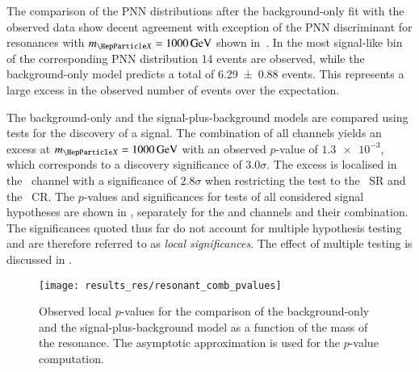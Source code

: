 The comparison of the PNN distributions after the background-only fit with the
observed data show decent agreement with exception of the PNN discriminant for
resonances with $\mX = \SI{1000}{\GeV}$ shown in~. In
the most signal-like bin of the corresponding PNN distribution 14 events are
observed, while the background-only model predicts a total of \num{6.29 +- 0.88}
events. This represents a large excess in the observed number of events over the
expectation.

%
The background-only and the signal-plus-background models are compared using
tests for the discovery of a signal. The combination of all channels yields an
excess at $\mX = \SI{1000}{\GeV}$ with an observed $p$-value of $\num{1.3e-3}$,
which corresponds to a discovery significance of $\num{3.0}\sigma$.
The excess is localised in the \hadhad~channel with a significance of
$\num{2.8}\sigma$ when restricting the test to the \hadhad~SR and the
\ZHF~CR. The $p$-values and significances for tests of all considered signal
hypotheses are shown in , separately for the \lephad and
\hadhad channels and their combination. The significances quoted thus far do not
account for multiple hypothesis testing and are therefore referred to as
\emph{local significances}. The effect of multiple testing is discussed in
.

\begin{figure}[htbp]
  \centering

  \texttt{[image: results\_res/resonant\_comb\_pvalues]}

  \caption[Observed local $p$-values of discovery tests performed in the search
  for resonant \HH production.]{Observed local $p$-values for the comparison of
    the background-only and the signal-plus-background model as a function of
    the mass of the resonance. The asymptotic approximation is used for the
    $p$-value computation.}%
  \label{fig:local_pvalues}

\end{figure}

